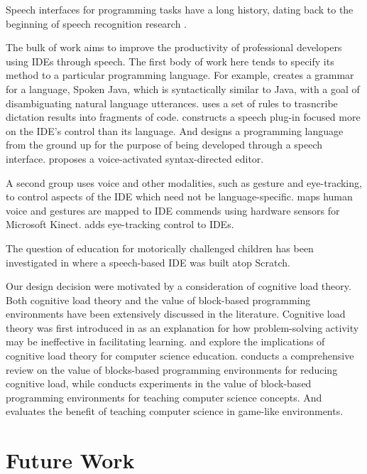 \documentclass[]{article}
\begin{document}
Speech interfaces for programming tasks have a long history, dating back to the
beginning of speech recognition research \cite{bolt1980put}.

The bulk of work aims to improve the productivity of professional developers
using IDEs through speech. The first body of work here tends to specify its
method to a particular programming language. For example,
\cite{Begel05programmingby} creates a grammar for a language, Spoken Java, which
is syntactically similar to Java, with a goal of disambiguating natural language
utterances. \cite{desilets2006voicecode} uses a set of rules to trasncribe
dictation results into fragments of code. \cite{shaik2003speechclipse}
constructs a speech plug-in focused more on the IDE's control than its language.
And \cite{gordon2011developing} designs a programming language from the ground
up for the purpose of being developed through a speech interface.
\cite{hubbell2006voice} proposes a voice-activated syntax-directed editor.

A second group uses voice and other modalities, such as gesture and
eye-tracking, to control aspects of the IDE which need not be language-specific.
\cite{delimarschi2014enabling} maps human voice and gestures are mapped to IDE
commends using hardware sensors for Microsoft Kinect. \cite{glucker2014eyede}
adds eye-tracking control to IDEs.

The question of education for motorically challenged children has been
investigated in \cite{wagner2012programming} where a speech-based IDE was built
atop Scratch.

Our design decision were motivated by a consideration of cognitive load theory.
Both cognitive load theory and the value of block-based programming environments
have been extensively discussed in the literature. Cognitive load theory was
first introduced in \cite{sweller1988cognitive} as an explanation for how
problem-solving activity may be ineffective in facilitating learning.
\cite{shaffer2003applying} and \cite{nolan2015examining} explore the
implications of cognitive load theory for computer science education.
\cite{bau2017learnable} conducts a comprehensive review on the value of
blocks-based programming environments for reducing cognitive load, while
\cite{meerbaum2013learning} conducts experiments in the value of block-based
programming environments for teaching computer science concepts. And
\cite{gibson2013evaluation} evaluates the benefit of teaching computer science
in game-like environments.





\section{Future Work}



\end{document}
